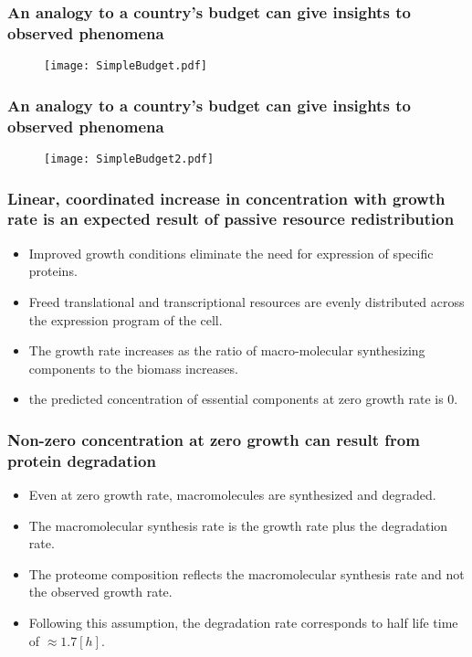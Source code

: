 \documentclass{beamer}
\begin{document}
\begin{frame}
\frametitle{An analogy to a country's budget can give insights to observed phenomena}
\begin{figure}[h!]
\centering
\texttt{[image: SimpleBudget.pdf]}
\end{figure}
\end{frame}

\begin{frame}
\frametitle{An analogy to a country's budget can give insights to observed phenomena}
\begin{figure}[h!]
\centering
\texttt{[image: SimpleBudget2.pdf]}
\end{figure}
\end{frame}

\begin{frame}
\frametitle{Linear, coordinated increase in concentration with growth rate is an expected result of passive resource redistribution}
\begin{itemize}
\item Improved growth conditions eliminate the need for expression of specific proteins.
\item Freed translational and transcriptional resources are evenly distributed across the expression program of the cell.
\item The growth rate increases as the ratio of macro-molecular synthesizing components to the biomass increases.
\item the predicted concentration of essential components at zero growth rate is 0.
\end{itemize}
\end{frame}

\begin{frame}
\frametitle{Non-zero concentration at zero growth can result from protein degradation}
\begin{itemize}
\item Even at zero growth rate, macromolecules are synthesized and degraded.
\item The macromolecular synthesis rate is the growth rate plus the degradation rate.
\item The proteome composition reflects the macromolecular synthesis rate and not the observed growth rate.
\item Following this assumption, the degradation rate corresponds to half life time of $\approx 1.7[h]$.
\end{itemize}
\end{frame}
\end{document}
